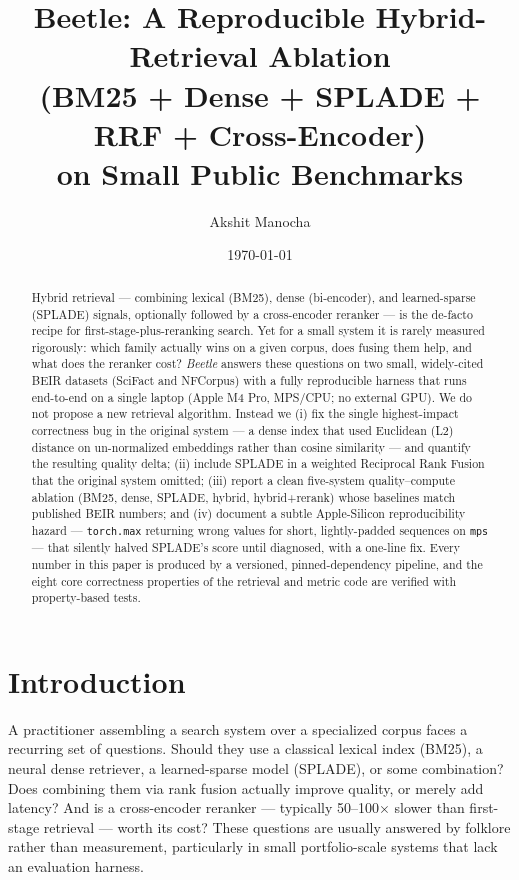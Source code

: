 \documentclass[11pt]{article}
\title{Beetle: A Reproducible Hybrid-Retrieval Ablation\\
       (BM25 + Dense + SPLADE + RRF + Cross-Encoder)\\
       on Small Public Benchmarks}
\author{Akshit Manocha}
\date{\today}
\begin{document}
\maketitle

\begin{abstract}
Hybrid retrieval --- combining lexical (BM25), dense (bi-encoder), and learned-sparse
(SPLADE) signals, optionally followed by a cross-encoder reranker --- is the
de-facto recipe for first-stage-plus-reranking search. Yet for a small system it
is rarely measured rigorously: which family actually wins on a given corpus, does
fusing them help, and what does the reranker cost? \emph{Beetle} answers these
questions on two small, widely-cited BEIR datasets (SciFact and NFCorpus)
with a fully reproducible harness that runs end-to-end on a single laptop (Apple
M4 Pro, MPS/CPU; no external GPU). We do not propose a new retrieval algorithm.
Instead we (i) fix the single highest-impact correctness bug in the original
system --- a dense index that used Euclidean (L2) distance on un-normalized
embeddings rather than cosine similarity --- and quantify the resulting quality
delta; (ii) include SPLADE in a weighted Reciprocal Rank Fusion that the original
system omitted; (iii) report a clean five-system quality--compute ablation (BM25,
dense, SPLADE, hybrid, hybrid+rerank) whose
baselines match published BEIR numbers; and (iv) document a subtle Apple-Silicon
reproducibility hazard --- \texttt{torch.max} returning wrong values for short,
lightly-padded sequences on \texttt{mps} --- that silently halved SPLADE's score
until diagnosed, with a one-line fix. Every number in this paper is produced by a
versioned, pinned-dependency pipeline, and the eight core correctness properties of
the retrieval and metric code are verified with property-based tests.
\end{abstract}

\section{Introduction}
\label{sec:intro}

A practitioner assembling a search system over a specialized corpus faces a
recurring set of questions. Should they use a classical lexical index (BM25), a
neural dense retriever, a learned-sparse model (SPLADE), or some combination?
Does combining them via rank fusion actually improve quality, or merely add
latency? And is a cross-encoder reranker --- typically 50--100$\times$ slower than
first-stage retrieval --- worth its cost? These questions are usually answered by
folklore rather than measurement, particularly in small portfolio-scale systems
that lack an evaluation harness.
\end{document}
